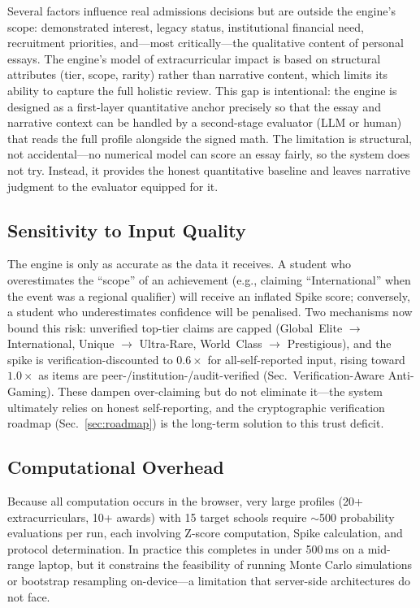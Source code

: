 \documentclass[conference]{IEEEtran}
\begin{document}
Several factors influence real admissions decisions but are outside the engine's scope: demonstrated interest, legacy status, institutional financial need, recruitment priorities, and---most critically---the qualitative content of personal essays. The engine's model of extracurricular impact is based on structural attributes (tier, scope, rarity) rather than narrative content, which limits its ability to capture the full holistic review. This gap is intentional: the engine is designed as a first-layer quantitative anchor precisely so that the essay and narrative context can be handled by a second-stage evaluator (LLM or human) that reads the full profile alongside the signed math. The limitation is structural, not accidental---no numerical model can score an essay fairly, so the system does not try. Instead, it provides the honest quantitative baseline and leaves narrative judgment to the evaluator equipped for it.

\subsection{Sensitivity to Input Quality}
The engine is only as accurate as the data it receives. A student who overestimates the ``scope'' of an achievement (e.g., claiming ``International'' when the event was a regional qualifier) will receive an inflated Spike score; conversely, a student who underestimates confidence will be penalised. Two mechanisms now bound this risk: unverified top-tier claims are capped (Global~Elite $\to$ International, Unique $\to$ Ultra-Rare, World~Class $\to$ Prestigious), and the spike is verification-discounted to $0.6\times$ for all-self-reported input, rising toward $1.0\times$ as items are peer-/institution-/audit-verified (Sec.~Verification-Aware Anti-Gaming). These dampen over-claiming but do not eliminate it---the system ultimately relies on honest self-reporting, and the cryptographic verification roadmap (Sec.~\ref{sec:roadmap}) is the long-term solution to this trust deficit.

\subsection{Computational Overhead}
Because all computation occurs in the browser, very large profiles (20+ extracurriculars, 10+ awards) with 15 target schools require $\sim$500 probability evaluations per run, each involving Z-score computation, Spike calculation, and protocol determination. In practice this completes in under 500\,ms on a mid-range laptop, but it constrains the feasibility of running Monte Carlo simulations or bootstrap resampling on-device---a limitation that server-side architectures do not face.
\end{document}
